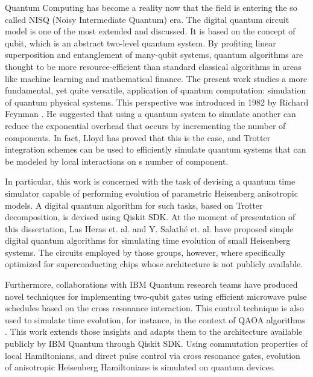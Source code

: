 Quantum Computing has become a reality now that the field is entering the so called NISQ (Noisy Intermediate Quantum) era. The digital quantum circuit model is one of the most extended and discussed. It is based on the concept of qubit, which is an abstract two-level quantum system. By profiting linear superposition and entanglement of many-qubit systems, quantum algorithms are thought to be more resource-efficient than standard classical algorithms in areas like machine learning and mathematical finance. The present work studies a more fundamental, yet quite versatile, application of quantum computation: simulation of quantum physical systems. This perspective was introduced in 1982 by Richard Feynman \cite{Feynman1982}. He suggested that using a quantum system to simulate another can reduce the exponential overhead that occurs by incrementing the number of components. In fact, Lloyd \cite{LloydNature} has proved that this is the case, and Trotter integration schemes can be used to efficiently simulate quantum systems that can be modeled by local interactions on s number of component.

In particular, this work is concerned with the task of devising a quantum time simulator capable of performing evolution of parametric Heisenberg anisotropic models. A digital quantum algorithm for such tasks, based on Trotter decomposition, is devised using Qiskit SDK. At the moment of presentation of this dissertation, Las Heras et. al. \cite{HubbardSimulLasHeras, HubbardSimul} and Y. Salathé et. al. \cite{HeisenbergSimulLasHeras} have proposed simple digital quantum algorithms for simulating time evolution of small Heisenberg systems. The circuits employed by those groups, however, where specifically optimized for superconducting chips whose architecture is not publicly available.

Furthermore, collaborations with IBM Quantum research teams \cite{DuplicatedRXZPulse, RXZPulseEfficient, MajoranaSimulation} have produced novel techniques for implementing two-qubit gates using efficient microwave pulse schedules based on the cross resonance interaction. This control technique is also used to simulate time evolution, for instance, in the context of QAOA algorithms \cite{RXZPulseEfficient}. This work extends those insights and adapts them to the architecture available publicly by IBM Quantum through Qiskit SDK. Using commutation properties of local Hamiltonians, and direct pulse control via cross resonance gates, evolution of anisotropic Heisenberg Hamiltonians is simulated on quantum devices.

